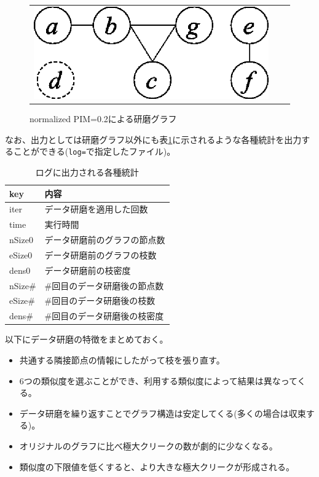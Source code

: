\begin{figure}[htbp]
\begin{center}
\begin{tabular}{ccc}
\begin{minipage}{0.3\hsize}
\begin{center}
\includegraphics[scale=0.5]{./pmi02.eps}
\caption{normalized PIM=0.2による研磨グラフ\label{fig:pmi02}}
\end{center}
\end{minipage}

\end{tabular}
\end{center}
\end{figure}

なお、出力としては研磨グラフ以外にも表\ref{tbl:stat}に示されるような各種統計を出力することができる(\verb|log=|で指定したファイル)。

\begin{table}[htbp]
\begin{center}
\caption{ログに出力される各種統計\label{tbl:stat}}
\begin{tabular}{ll}
\hline
key & 内容 \\
\hline
iter & データ研磨を適用した回数 \\
time & 実行時間\\
nSize0 & データ研磨前のグラフの節点数 \\
eSize0 & データ研磨前のグラフの枝数 \\
dens0  & データ研磨前の枝密度 \\
nSize\# & \#回目のデータ研磨後の節点数 \\
eSize\# & \#回目のデータ研磨後の枝数 \\
dens\#  & \#回目のデータ研磨後の枝密度 \\

\hline
\end{tabular} 
\end{center}
\end{table}


以下にデータ研磨の特徴をまとめておく。
\begin{itemize}
\item 共通する隣接節点の情報にしたがって枝を張り直す。
\item 6つの類似度を選ぶことができ、利用する類似度によって結果は異なってくる。
\item データ研磨を繰り返すことでグラフ構造は安定してくる(多くの場合は収束する)。
\item オリジナルのグラフに比べ極大クリークの数が劇的に少なくなる。
\item 類似度の下限値を低くすると、より大きな極大クリークが形成される。
\end{itemize}


